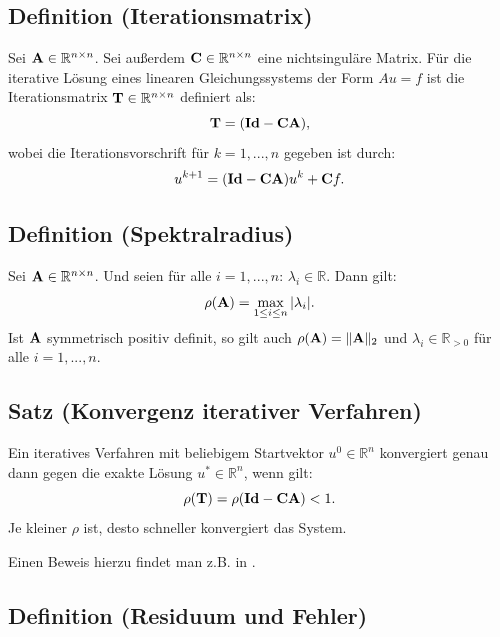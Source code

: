 \subsection{Definition (Iterationsmatrix)}\label{ss.Iterationsmatrix}

Sei ${\textbf{A}} \in \mathbb{R}^{n \times n}$. Sei außerdem ${\textbf{C}} \in \mathbb{R}^{n \times n}$ eine nichtsinguläre Matrix. Für die iterative Lösung eines linearen Gleichungssystems der Form $Au = f$ ist die Iterationsmatrix ${\textbf{T}} \in \mathbb{R}^{n \times n}$ definiert als:
\begin{equation}
{\textbf{T}} = ({\textbf{Id}} - {\textbf{C}} {\textbf{A}}),
\end{equation}
wobei die Iterationsvorschrift für $k=1,...,n$ gegeben ist durch:
\begin{equation}
u^{k+1} = ({\textbf{Id}} - {\textbf{C}} {\textbf{A}})u^{k} + {\textbf{C}} f.\label{eq.Iteratives Verfahren}
\end{equation}

\subsection{Definition (Spektralradius)}\label{s.Spektralradius}

Sei ${\textbf{A}} \in \mathbb{R}^{n \times n}$. Und seien für alle $i=1,...,n$: $\lambda_{i} \in \mathbb{R}$. Dann gilt:
\begin{equation}
\rho({\textbf{A}}) = \max_{1 \le i \le n} | \lambda_{i} |.
\end{equation}
Ist ${\textbf{A}}$ symmetrisch positiv definit, so gilt auch $\rho({\textbf{A}}) = \| {\textbf{A}} \|_{2}$ und $\lambda_{i} \in \mathbb{R}_{>0}$ für alle $i=1,...,n$.

\subsection{Satz (Konvergenz iterativer Verfahren)}\label{ss.Konvergenz iterativer Verfahren}

Ein iteratives Verfahren mit beliebigem Startvektor $u^{0} \in \mathbb{R}^{n}$ konvergiert genau dann gegen die exakte Lösung $u^{*} \in \mathbb{R}^{n}$, wenn gilt:
\begin{equation}
\rho({\textbf{T}}) = \rho({\textbf{Id}} - {\textbf{C}} {\textbf{A}}) < 1.
\end{equation}
Je kleiner $\rho$ ist, desto schneller konvergiert das System.

Einen Beweis hierzu findet man z.B. in \cite[S. 550]{DR08}.

\subsection{Definition (Residuum und Fehler)}\label{ss.Residuum und Fehler}

